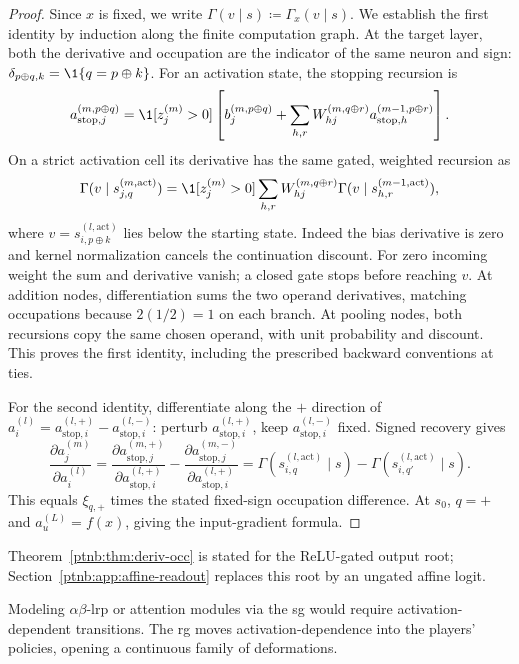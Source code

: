 \begin{proof}
Since $x$ is fixed, we write $\Gamma(v\mid s)\coloneqq\Gamma_x(v\mid s)$. We establish the first identity by induction along the finite computation graph. At the target layer, both the derivative and occupation are the indicator
of the same neuron and sign: $\delta_{p\oplus q,k}=\1\{q=p\oplus k\}$.
For an activation state, the stopping recursion is
\begin{equation}\label{ptnb:eq:adf-astop-recursion}
 a_{\mathrm{stop},j}^{(m,p\oplus q)}
 =\1[z_j^{(m)}>0]\left[b_j^{(m,p\oplus q)}+
 \sum_{h,r}W_{hj}^{(m,q\oplus r)}a_{\mathrm{stop},h}^{(m-1,p\oplus r)}\right].
\end{equation}
On a strict activation cell its derivative has the same gated, weighted recursion as
\[
 \Gamma(v\mid s_{j,q}^{(m,\mathrm{act})})
 =\1[z_j^{(m)}>0]\sum_{h,r}W_{hj}^{(m,q\oplus r)}
       \Gamma(v\mid s_{h,r}^{(m-1,\mathrm{act})}),
\]
where $v=s_{i,p\oplus k}^{(l,\mathrm{act})}$ lies below the starting state.
Indeed the bias derivative is zero and kernel normalization cancels the continuation discount.
For zero incoming weight the sum and derivative vanish; a closed gate stops before reaching $v$.
At addition nodes, differentiation sums the two operand derivatives, matching occupations because
$2(1/2)=1$ on each branch. At pooling nodes, both recursions copy the same chosen operand, with
unit probability and discount. This proves the first identity, including the prescribed backward
conventions at ties.

For the second identity, differentiate along the $+$ direction of $a_i^{(l)}=a_{\mathrm{stop},i}^{(l,+)}-
 a_{\mathrm{stop},i}^{(l,-)}$: perturb $a_{\mathrm{stop},i}^{(l,+)}$, keep $a_{\mathrm{stop},i}^{(l,-)}$ fixed. Signed recovery gives
\[
 \frac{\partial a_j^{(m)}}{\partial a_i^{(l)}}
 =\frac{\partial a_{\mathrm{stop},j}^{(m,+)}}{\partial a_{\mathrm{stop},i}^{(l,+)}}
  -\frac{\partial a_{\mathrm{stop},j}^{(m,-)}}{\partial a_{\mathrm{stop},i}^{(l,+)}}
 =\Gamma(s_{i,q}^{(l,\mathrm{act})}\mid s)-\Gamma(s_{i,q'}^{(l,\mathrm{act})}\mid s).
\]
This equals $\xi_{q,+}$ times the stated fixed-sign occupation difference. At $s_0$,
$q=+$ and $a_u^{(L)}=f(x)$, giving the input-gradient formula.
\end{proof}

Theorem~\ref{ptnb:thm:deriv-occ} is stated for the ReLU-gated output root; Section~\ref{ptnb:app:affine-readout} replaces this root by an ungated affine logit.

Modeling $\alpha\beta$-\ac{lrp} or attention modules via the \ac{sg} would require
activation-dependent transitions. The \ac{rg} moves activation-dependence into the players'
policies, opening a continuous family of deformations.

